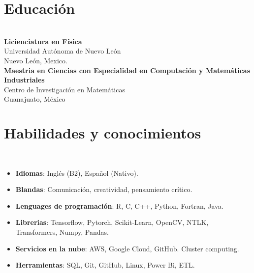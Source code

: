 \documentclass[a3paper]{adcv_color}
\newcommand{\proyect}[2]{
\textbf{#2}\\
{\color{linktext}	\textbf {#1}}
\vspace{-1cm}\\
}
\begin{document}

\begin{minipage}{0.38\linewidth}
	\section{Educación}\\

	\textbf{Licienciatura en Física} \\
	Universidad Autónoma de Nuevo León\\
	Nuevo León, Mexico.\\

	\textbf{Maestria en Ciencias con Especialidad en Computación y Matemáticas Industriales}\\
	Centro de Investigación en Matemáticas\\
	Guanajuato, México
\end{minipage}
\begin{minipage}{0.62\linewidth}
	\section{Habilidades y conocimientos}\\
	\begin{itemize}
		\setlength\itemsep{0em}
		\item \textbf{Idiomas}: Inglés (B2), Español (Nativo).
		\item \textbf{Blandas}:
		      Comunicación, creatividad, pensamiento crítico.
		\item \textbf{Lenguages de programación}:
		      R, C, C++, Python, Fortran, Java.
		\item \textbf{Librerias}:
		      Tensorflow, Pytorch, Scikit-Learn, OpenCV, NTLK, Transformers, Numpy, Pandas.
		\item \textbf{Servicios en la nube}:
		      AWS, Google Cloud, GitHub. Cluster computing.
		\item \textbf{Herramientas}:
		      SQL, Git, GitHub, Linux, Power Bi, ETL.
	\end{itemize}
\end{minipage}



\end{document}
